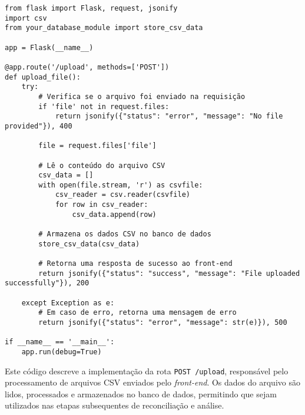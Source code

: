 \begin{verbatim}
from flask import Flask, request, jsonify
import csv
from your_database_module import store_csv_data

app = Flask(__name__)

@app.route('/upload', methods=['POST'])
def upload_file():
    try:
        # Verifica se o arquivo foi enviado na requisição
        if 'file' not in request.files:
            return jsonify({"status": "error", "message": "No file provided"}), 400

        file = request.files['file']
        
        # Lê o conteúdo do arquivo CSV
        csv_data = []
        with open(file.stream, 'r') as csvfile:
            csv_reader = csv.reader(csvfile)
            for row in csv_reader:
                csv_data.append(row)

        # Armazena os dados CSV no banco de dados
        store_csv_data(csv_data)

        # Retorna uma resposta de sucesso ao front-end
        return jsonify({"status": "success", "message": "File uploaded successfully"}), 200

    except Exception as e:
        # Em caso de erro, retorna uma mensagem de erro
        return jsonify({"status": "error", "message": str(e)}), 500

if __name__ == '__main__':
    app.run(debug=True)
\end{verbatim}

Este código descreve a implementação da rota \texttt{POST /upload}, responsável pelo processamento de arquivos CSV enviados pelo \textit{front-end}. Os dados do arquivo são lidos, processados e armazenados no banco de dados, permitindo que sejam utilizados nas etapas subsequentes de reconciliação e análise.

